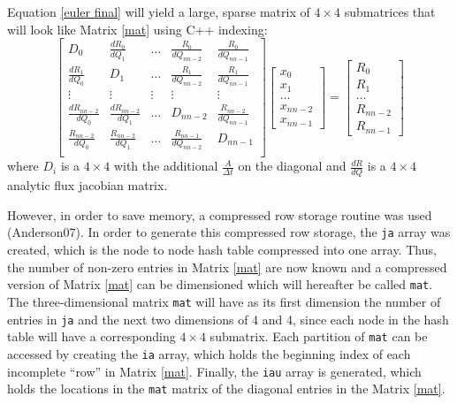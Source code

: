 \documentclass[letterpaper,twoside,11pt,openright,pdf]{book} %
\def\eqstart{\begin{equation}}
\def\eqend{\end{equation}}
\begin{document}
Equation \ref{euler final} will yield a large, sparse matrix of \(4\times4\) submatrices that will look like Matrix \ref{mat} using C++ indexing:
\eqstart
\left[
\begin{array}{ccccc}
D_0 & \frac{dR_0}{dQ_1} & \dots & \frac{R_0}{dQ_{nn-2}} & \frac{R_0}{dQ_{nn-1}} \\
\frac{dR_1}{dQ_0} & D_1 & \dots & \frac{R_1}{dQ_{nn-2}} & \frac{R_1}{dQ_{nn-1}} \\
\vdots & \vdots & \vdots & \vdots & \vdots \\
\frac{dR_{nn-2}}{dQ_0} & \frac{dR_{nn-2}}{dQ_1} & \dots & D_{nn-2} & \frac{R_{nn-2}}{dQ_{nn-1}} \\
\frac{R_{nn-2}}{dQ_0} & \frac{R_{nn-2}}{dQ_1} & \dots & \frac{R_{nn-1}}{dQ_{nn-2}} & D_{nn-1} \\
\end{array}
\right] 
\left[
\begin{array}{c}
x_0 \\ x_1 \\ \dots \\ x_{nn-2} \\ x_{nn-1}
\end{array}
\right]
=
\left[
\begin{array}{c}
R_0 \\ R_1 \\ \dots \\ R_{nn-2} \\ R_{nn-1}
\end{array}
\right]
\label{mat}
\eqend
where \(D_i\) is a \(4\times4\) with the additional \(\frac{A}{\Delta t}\) on the diagonal and \(\frac{dR}{dQ}\) is a \(4\times4\) analytic flux jacobian matrix.

However, in order to save memory, a compressed row storage routine was used (Anderson07).  In order to generate this compressed row storage, the \verb+ja+ array was created, which is the node to node hash table compressed into one array.  Thus, the number of non-zero entries in Matrix \ref{mat} are now known and a compressed version of Matrix \ref{mat} can be dimensioned which will hereafter be called \verb+mat+. The three-dimensional matrix \verb+mat+ will have as its first dimension the number of entries in \verb+ja+ and the next two dimensions of 4 and 4, since each node in the hash table will have a corresponding \(4\times4\) submatrix.  Each partition of \verb+mat+ can be accessed by creating the \verb+ia+ array, which holds the beginning index of each incomplete ``row'' in Matrix \ref{mat}.  Finally, the \verb+iau+ array is generated, which holds the locations in the \verb+mat+ matrix of the diagonal entries in the Matrix \ref{mat}.
\end{document}

